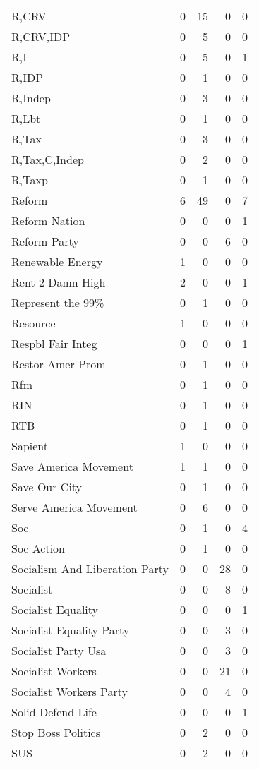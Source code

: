 \begin{supertabular}{lrrrr}
R,CRV & 0 & 15 & 0 & 0\\
R,CRV,IDP & 0 & 5 & 0 & 0\\
R,I & 0 & 5 & 0 & 1\\
R,IDP & 0 & 1 & 0 & 0\\
R,Indep & 0 & 3 & 0 & 0\\
R,Lbt & 0 & 1 & 0 & 0\\
R,Tax & 0 & 3 & 0 & 0\\
R,Tax,C,Indep & 0 & 2 & 0 & 0\\
R,Taxp & 0 & 1 & 0 & 0\\
Reform & 6 & 49 & 0 & 7\\
Reform Nation & 0 & 0 & 0 & 1\\
Reform Party & 0 & 0 & 6 & 0\\
Renewable Energy & 1 & 0 & 0 & 0\\
Rent 2 Damn High & 2 & 0 & 0 & 1\\
Represent the 99\% & 0 & 1 & 0 & 0\\
Resource & 1 & 0 & 0 & 0\\
Respbl Fair Integ & 0 & 0 & 0 & 1\\
Restor Amer Prom & 0 & 1 & 0 & 0\\
Rfm & 0 & 1 & 0 & 0\\
RIN & 0 & 1 & 0 & 0\\
RTB & 0 & 1 & 0 & 0\\
Sapient & 1 & 0 & 0 & 0\\
Save America Movement & 1 & 1 & 0 & 0\\
Save Our City & 0 & 1 & 0 & 0\\
Serve America Movement & 0 & 6 & 0 & 0\\
Soc & 0 & 1 & 0 & 4\\
Soc Action & 0 & 1 & 0 & 0\\
Socialism And Liberation Party & 0 & 0 & 28 & 0\\
Socialist & 0 & 0 & 8 & 0\\
Socialist Equality & 0 & 0 & 0 & 1\\
Socialist Equality Party & 0 & 0 & 3 & 0\\
Socialist Party Usa & 0 & 0 & 3 & 0\\
Socialist Workers & 0 & 0 & 21 & 0\\
Socialist Workers Party & 0 & 0 & 4 & 0\\
Solid Defend Life & 0 & 0 & 0 & 1\\
Stop Boss Politics & 0 & 2 & 0 & 0\\
SUS & 0 & 2 & 0 & 0\\

\end{supertabular}
